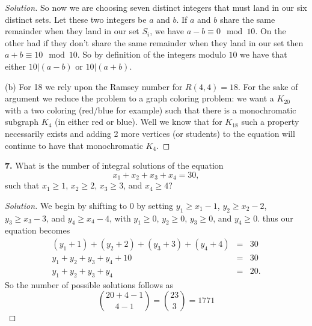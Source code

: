 \documentclass[12pt]{amsart}
\newenvironment{solution}
{\begin{proof}[Solution]}
{\end{proof}}
\begin{document}
\begin{onehalfspace}
\begin{solution}
            So now we are choosing seven distinct integers that must land in our six distinct sets.
            Let these two integers be $a$ and $b$.
            If $a$ and $b$ share the same remainder when they land in our set $S_i$, we have
            $a-b\equiv 0 \mod{10}$.
            On the other had if they don't share the same remainder when they land in our set then
            $a+b\equiv 10 \mod{10}$.
            So by definition of the integers modulo $10$ we have that either $10|(a-b)$ or $10|(a+b)$.

            (b) For 18 we rely upon the Ramsey number for $R(4,4)=18$.
            For the sake of argument we reduce the problem to a graph coloring problem: we want a
            $K_{20}$ with a two coloring (red/blue for example) such that there is a monochromatic
            subgraph $K_4$ (in either red or blue).
            Well we know that for $K_{18}$ such a property necessarily exists and adding 2 more vertices (or
            students) to the equation will continue to have that monochromatic $K_4$.
        \end{solution}

        \noindent\textbf{7.} What is the number of integral solutions of the equation
        \begin{displaymath}
            x_1 + x_2 + x_3 + x_4 = 30,
        \end{displaymath}
        such that $x_1 \ge 1$, $x_2 \ge 2$, $x_3 \ge 3$, and $x_4 \ge 4$?
        \begin{solution}
            We begin by shifting to 0 by setting $y_1 \ge x_1 - 1$, $y_2 \ge x_2 - 2$,
            $y_3 \ge x_3 - 3$, and $y_4 \ge x_4 - 4$, with $y_1\ge 0$, $y_2\ge 0$, $y_3\ge 0$, and $y_4\ge 0$.
            thus our equation becomes
            \begin{eqnarray*}
                (y_1+1) + (y_2+2) + (y_3+3) + (y_4+4) & = & 30\\
                y_1 + y_2 + y_3 + y_4 + 10 & = & 30\\
                y_1 + y_2 + y_3 + y_4 & = & 20.
            \end{eqnarray*}
            So the number of possible solutions follows as
            \begin{displaymath}
                \binom{20 + 4 - 1}{4 - 1} = \binom{23}{3} = 1771
            \end{displaymath}
        \end{solution}


\end{onehalfspace}
\end{document}

